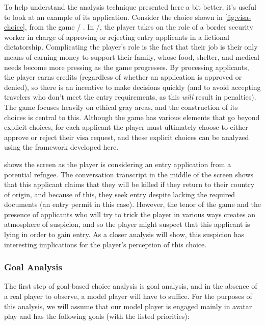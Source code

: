 To help understand the analysis technique presented here a bit better, it's useful to look at an example of its application.
%
Consider the choice shown in \cref{fig:visa-choice}, from the game \papersplease/ \citep{PapersPlease}.
%
In \papersplease/, the player takes on the role of a border security worker in charge of approving or rejecting entry applicants in a fictional dictatorship.
%
Complicating the player's role is the fact that their job is their only means of earning money to support their family, whose food, shelter, and medical needs become more pressing as the game progresses.
%
By processing applicants, the player earns credits (regardless of whether an application is approved or denied), so there is an incentive to make decisions quickly (and to avoid accepting travelers who don't meet the entry requirements, as this \emph{will} result in penalties).
%
The game focuses heavily on ethical gray areas, and the construction of its choices is central to this.
%
Although the game has various elements that go beyond explicit choices, for each applicant the player must ultimately choose to either approve or reject their visa request, and these explicit choices can be analyzed using the framework developed here.


 shows the screen as the player is considering an entry application from a potential refugee.
%
The conversation transcript in the middle of the screen shows that this applicant claims that they will be killed if they return to their country of origin, and because of this, they seek entry despite lacking the required documents (an entry permit in this case).
%
However, the tenor of the game and the presence of applicants who will try to trick the player in various ways creates an atmosphere of suspicion, and so the player might suspect that this applicant is lying in order to gain entry.
%
As a closer analysis will show, this suspicion has interesting implications for the player's perception of this choice.

\subsubsection{Goal Analysis}

The first step of goal-based choice analysis is goal analysis, and in the absence of a real player to observe, a model player will have to suffice.
%
For the purposes of this analysis, we will assume that our model player is engaged mainly in avatar play and has the following goals (with the listed priorities):

